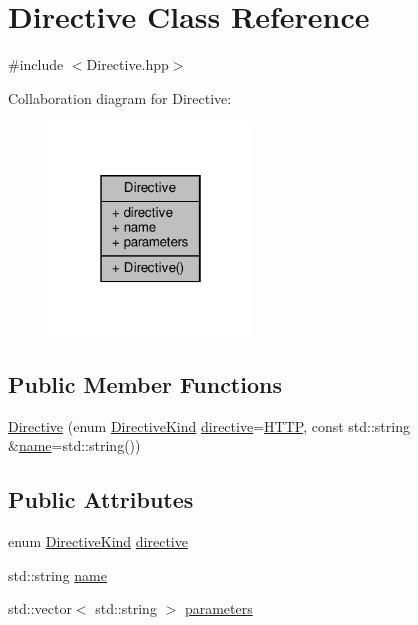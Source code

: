 \hypertarget{classft_1_1_directive}{}\section{Directive Class Reference}
\label{classft_1_1_directive}


{\ttfamily \#include $<$Directive.\+hpp$>$}



Collaboration diagram for Directive\+:\nopagebreak
\begin{figure}[H]
\begin{center}
\leavevmode
\includegraphics[width=154pt]{classft_1_1_directive__coll__graph}
\end{center}
\end{figure}
\subsection*{Public Member Functions}
\begin{DoxyCompactItemize}
\item 
\hyperlink{classft_1_1_directive_aedcc052461811957b6a8610e0c72968d}{Directive} (enum \hyperlink{namespaceft_a5a5554dff10f0dc50bae4cc5825ad75d}{Directive\+Kind} \hyperlink{classft_1_1_directive_ad974f853279afa5ad30a28773b94fe87}{directive}=\hyperlink{namespaceft_a5a5554dff10f0dc50bae4cc5825ad75da67e044074f46e6cea22788527da5f02e}{H\+T\+TP}, const std\+::string \&\hyperlink{classft_1_1_directive_a9b45b3e13bd9167aab02e17e08916231}{name}=std\+::string())
\end{DoxyCompactItemize}
\subsection*{Public Attributes}
\begin{DoxyCompactItemize}
\item 
enum \hyperlink{namespaceft_a5a5554dff10f0dc50bae4cc5825ad75d}{Directive\+Kind} \hyperlink{classft_1_1_directive_ad974f853279afa5ad30a28773b94fe87}{directive}
\item 
std\+::string \hyperlink{classft_1_1_directive_a9b45b3e13bd9167aab02e17e08916231}{name}
\item 
std\+::vector$<$ std\+::string $>$ \hyperlink{classft_1_1_directive_a2197fbfab6b0ae80e5599c8ddc562479}{parameters}
\end{DoxyCompactItemize}


